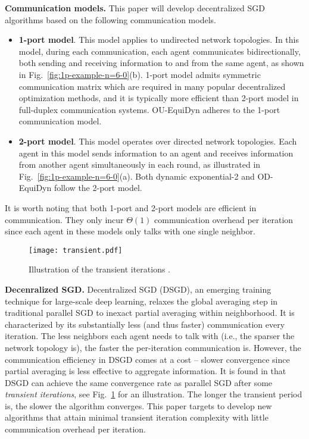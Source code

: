 \documentclass{article}
\theoremstyle{plain}
\theoremstyle{definition}
\begin{document}
\textbf{Communication models.} This paper will develop decentralized SGD algorithms based on the following communication models. 
\begin{itemize}[leftmargin=10pt]
    \item \textbf{1-port model}. This model {applies to} undirected network topologies. {In this model, during each communication, each agent communicates bidirectionally, both sending and receiving information to and from the same agent, as shown in } Fig.~\ref{fig:1p-example-n=6-0}(b). 1-port model admits symmetric communication matrix which are required in many popular decentralized optimization methods, and it is typically more efficient than 2-port model in full-duplex communication systems. OU-EquiDyn \cite{song2022communication} {adheres to} the 1-port communication model.

    \item \textbf{2-port model}. This model {operates} over directed network topologies. Each agent in this model sends information to an agent and receives information from another agent simultaneously in each round, {as illustrated in} Fig.~\ref{fig:1p-example-n=6-0}(a). Both dynamic exponential-2 \cite{ying2021exponential} and OD-EquiDyn \cite{song2022communication} follow the 2-port  model. 
\end{itemize}

It is worth noting that both 1-port and 2-port models are efficient in communication. They only incur $\Theta(1)$ communication overhead per iteration since each agent in these models only talks with one single neighbor. 





\begin{figure}[t]
\begin{center}
\centerline{\texttt{[image: transient.pdf]}}
\vskip -0.2in
\caption{
Illustration of the transient iterations \cite{ying2021exponential}.}
\label{fig:transient}
\end{center}
\vskip -0.3in
\end{figure}

\textbf{Decenralized SGD.} Decentralized SGD (DSGD), an emerging training technique for large-scale deep learning, relaxes the global averaging step in traditional parallel SGD to inexact partial averaging within neighborhood. It is characterized by its substantially less (and thus faster) communication every iteration. The less neighbors each agent needs to talk with (i.e., the sparser the network topology is), the faster the per-iteration communication is. However, the communication efficiency in DSGD comes at a cost -- slower convergence since partial averaging is less effective to aggregate information. 
It is found in \cite{lian2017can,pu2019sharp,koloskova2020unified} that DSGD can achieve the same convergence rate as parallel SGD after some {\em transient iterations}, see Fig.~\ref{fig:transient} for an illustration. The longer the transient period is, the slower the algorithm converges. This paper targets to develop new algorithms that attain minimal transient iteration complexity with little  communication overhead per iteration. 
\end{document}

